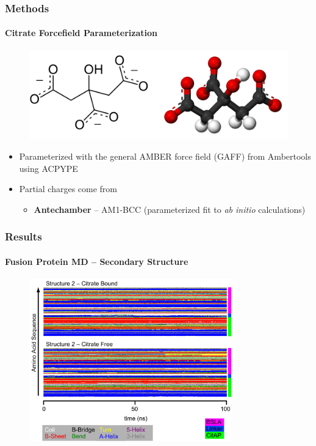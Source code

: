 \documentclass[english]{beamer}
\begin{document}
\begin{frame}
    \frametitle{Methods}
    \framesubtitle{Citrate Forcefield Parameterization}

    \begin{figure}
        \includegraphics[width=.7\linewidth]{figures/citrate.png}
    \end{figure}      

    \begin{itemize}
        \item Parameterized with the general AMBER force field (GAFF) from Ambertools using ACPYPE
        \item Partial charges come from
        \begin{itemize}
            \item \textbf{Antechamber} -- AM1-BCC (parameterized fit to \textit{ab initio} calculations)
        \end{itemize}
    \end{itemize}

    \tiny

\end{frame}   


\begin{frame}
    \frametitle{Results}
    \framesubtitle{Fusion Protein MD -- Secondary Structure}  

    \begin{figure}
        \includegraphics[width=0.78\textwidth]{figures/DSSP/dssp_presentation.pdf}
    \end{figure}        
    
\end{frame}      
\end{document}
